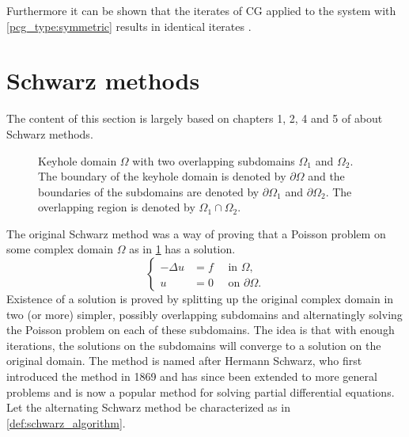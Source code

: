 Furthermore it can be shown that the iterates of CG applied to the system with \ref{pcg_type:symmetric} results in identical iterates \cite[Algorithm 9.2]{iter_method_saad}.

\section{Schwarz methods}\label{sec:schwarz_methods}
The content of this section is largely based on chapters 1, 2, 4 and 5 of \cite{schwarz_methods_Dolean_2015} about Schwarz methods.
\begin{figure}[H]
  \centering
  
  \caption{Keyhole domain $\Omega$ with two overlapping subdomains $\Omega_1$ and $\Omega_2$. The boundary of the keyhole domain is denoted by $\partial\Omega$ and the boundaries of the subdomains are denoted by $\partial\Omega_1$ and $\partial\Omega_2$. The overlapping region is denoted by $\Omega_1 \cap \Omega_2$.}
  \label{fig:keyhole_domain}
\end{figure}
The original Schwarz method was a way of proving that a Poisson problem on some complex domain $\Omega$ as in \cref{fig:keyhole_domain} has a solution.
\begin{equation}
  \begin{cases}
    -\Delta u &= f \quad \text{ in } \Omega, \\
    u &= 0 \quad \text{ on } \partial \Omega.
  \end{cases}
  \label{eq:poisson_problem}
\end{equation}
Existence of a solution is proved by splitting up the original complex domain in two (or more) simpler, possibly overlapping subdomains and alternatingly solving the Poisson problem on each of these subdomains. The idea is that with enough iterations, the solutions on the subdomains will converge to a solution on the original domain. The method is named after Hermann Schwarz, who first introduced the method in 1869 \cite{og_schwarz_method_Schwarz} and has since been extended to more general problems and is now a popular method for solving partial differential equations. Let the alternating Schwarz method be characterized as in \cref{def:schwarz_algorithm}.
